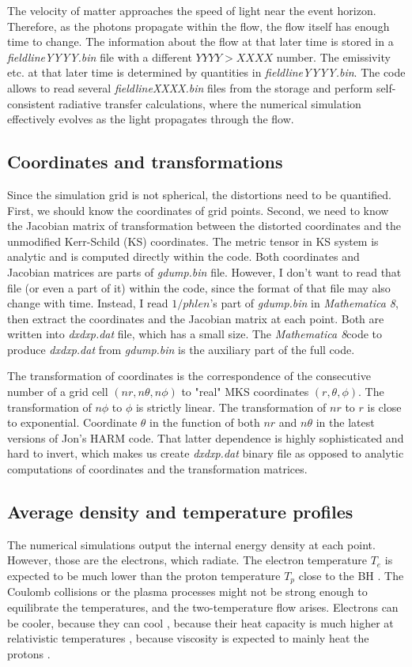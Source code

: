 \documentclass{emulateapj}
\newcommand{\mat}{\textit{Mathematica 8}}
\begin{document}
The velocity of matter approaches the speed of light near the event horizon. Therefore, as the photons propagate within the flow, the flow itself has enough time to change.
The information about the flow at that later time is stored in a \textit{fieldlineYYYY.bin} file with a different $YYYY>XXXX$ number. The emissivity etc.
at that later time is determined by quantities in \textit{fieldlineYYYY.bin}. The code allows to read several \textit{fieldlineXXXX.bin} files from the storage
and perform self-consistent radiative transfer calculations, where the numerical simulation effectively evolves as the light propagates through the flow.

\subsection{Coordinates and transformations}
Since the simulation grid is not spherical, the distortions need to be quantified.
First, we should know the coordinates of grid points. Second, we need to know the Jacobian matrix of transformation between the distorted coordinates and
the unmodified Kerr-Schild (KS) coordinates. The metric tensor in KS system is analytic and is computed directly within the code.
Both coordinates and Jacobian matrices are parts of \textit{gdump.bin} file. However, I don't want to read that file (or even a part of it) within the code,
since the format of that file may also change with time. Instead, I read $1/phlen$'s part of \textit{gdump.bin} in \mat, then extract the coordinates and the Jacobian matrix at each point.
Both are written into \textit{dxdxp.dat} file, which has a small size.
The \mat code to produce \textit{dxdxp.dat} from \textit{gdump.bin} is the auxiliary part of the full code.

The transformation of coordinates is the correspondence of the consecutive number of a grid cell $(nr,n\theta,n\phi)$ to "real" MKS coordinates $(r,\theta,\phi)$.
The transformation of $n\phi$ to $\phi$ is strictly linear. The transformation of $nr$ to $r$ is close to exponential.
Coordinate $\theta$ in the function of both $nr$ and $n\theta$ in the latest versions of Jon's HARM code.
That latter dependence is highly sophisticated and hard to invert, which makes us create \textit{dxdxp.dat} binary file as opposed to analytic computations of coordinates
and the transformation matrices.

\subsection{Average density and temperature profiles}
The numerical simulations output the internal energy density at each point. However, those are the electrons, which radiate.
The electron temperature $T_e$ is expected to be much lower than the proton temperature $T_p$ close to the BH \citep{Narayan:1995kj}.
The Coulomb collisions or the plasma processes might not be strong enough to equilibrate the temperatures, and the two-temperature flow arises.
Electrons can be cooler, because they can cool \citep{Drappeau:2012dq}, because their heat capacity is much higher at relativistic temperatures \citep{Shcherbakov:2010cond},
because viscosity is expected to mainly heat the protons \citep{Narayan:1995kj,Sharma_heating:2007}.
\end{document}
